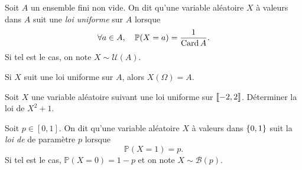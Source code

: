 \documentclass{magnolia}
\begin{document}
\begin{definition}[nom={Loi uniforme}]
Soit $A$ un ensemble fini non vide. On dit qu'une variable aléatoire $X$ à valeurs dans $A$
suit une \emph{loi uniforme} sur $A$ lorsque
\[\forall a\in A,\quad \mathbb{P}(X=a)=\frac{1}{\operatorname{Card} A}.\]
Si tel est le cas, on note $X\sim\mathcal{U}(A)$.
\end{definition}

\begin{remarqueUnique}
\remarque Si $X$ suit une loi uniforme sur $A$, alors $X(\Omega)=A$.
\end{remarqueUnique}
\begin{exoUnique}
\exo Soit $X$ une variable aléatoire suivant une loi uniforme sur $\left\llbracket -2,2\right\rrbracket$. Déterminer la loi
  de $X^2+1$.
\end{exoUnique}


\begin{definition}[nom={Loi de \nom{Bernoulli}}]
Soit $p\in[0,1]$. On dit qu'une variable aléatoire $X$ à valeurs dans $\left\{0,1\right\}$ suit la \emph{loi de
} de paramètre $p$ lorsque
\[\mathbb{P}(X=1)=p.\]
Si tel est le cas, $\mathbb{P}(X=0)=1-p$ et on note $X\sim\mathcal{B}(p)$.
\end{definition}
\end{document}
